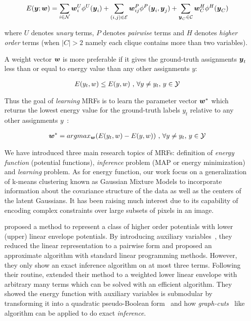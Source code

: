 \documentclass[twoside,doublespace,onecolumn,11pt,a4paper]{book}
\renewcommand{\citename}{\citet}
\renewcommand{\cite}{\citep}
\begin{document}
\begin{align}
  \label{eq:energyfunction_UPH}
  E({\boldsymbol{y}};{\boldsymbol{w}})=\sum_{i\in {\cal N}}{{\boldsymbol{w}}_i^U\phi^U({\boldsymbol{y}}_i)}+
  \sum_{(i,j)\in {\cal E}}{{\boldsymbol{w}}_{ij}^P\phi^P({\boldsymbol{y}}_i,{\boldsymbol{y}}_j)}+
  \sum_{{\boldsymbol{y}}_C\in {\cal C}}{{\boldsymbol{w}}_C^H\phi^H({\boldsymbol{y}}_C)}
\end{align}

\noindent where $U$ denotes \emph{unary} terms, $P$ denotes
\emph{pairwise} terms and $H$ denotes \emph{higher order} terms
(when $|C|>2$ namely each clique contains more than two
variables).

A weight vector ${\boldsymbol{w}}$ is more preferable if it gives the
ground-truth assignments ${\boldsymbol{y}}_t$ less than or equal to energy
value than any other assignments $y$:

\begin{align}
E(y_t,w)\leq E(y,w)~ \text{,~}\forall y \neq y_t
\text{,~} y\in {\cal Y}
\end{align}


Thus the goal of \emph{learning} MRFs is to learn the parameter
vector ${\boldsymbol{w}}^*$ which returns the lowest energy value for the
ground-truth labels $y_t$ relative to any other assignments
$y$~\cite{Szummer:ECCV08}:

\begin{align}
{\boldsymbol{w}}^* = argmax_{{\boldsymbol{w}}}(E(y_t,w)-E(y,w))~ \text{,~}\forall y \neq y_t
\text{,~} y\in {\cal Y}
\end{align}

We have introduced three main research topics of MRFs: definition
of \emph{energy function} (potential functions), \emph{inference}
problem (MAP or energy minimization) and \emph{learning} problem.
As for energy function, our work focus on a generalization of
k-means clustering known as Gaussian Mixture Models to
incorporate information about the covariance structure of the
data as well as the centers of the latent Gaussians. It has been
raising much interest due to its capability of encoding complex
constraints over large subsets of pixels in an image.

\citename{kohli2009robust} proposed a method to represent a class
of higher order potentials with lower (upper) linear envelope
potentials. By introducing auxiliary
variables~\cite{Kohli:CVPR10}, they reduced the linear
representation to a pairwise form and proposed an approximate
algorithm with standard linear programming methods. However, they
only show an exact inference algorithm on at most three terms.
Following their routine, \citename{gouldlearning} extended their
method to a weighted lower linear envelope with arbitrary many
terms which can be solved with an efficient algorithm. They
showed the energy function with auxiliary variables is submodular
by transforming it into a quadratic pseudo-Boolean
form~\cite{Boros:MATH02} and how
\emph{graph-cuts}~\cite{Hammer:1965, Boykov:ICCV01,
  Freedman:CVPR05} like algorithm can be applied to do exact
\emph{inference}.
\end{document}
